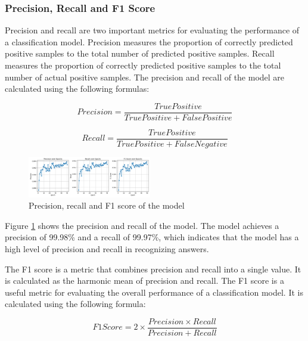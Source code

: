 \documentclass[twocolumn]{article}
\begin{document}
    \subsubsection{Precision, Recall and F1 Score}
    Precision and recall are two important metrics for evaluating the performance of a classification model. Precision measures the proportion of correctly predicted positive samples to the total number of predicted positive samples. Recall measures the proportion of correctly predicted positive samples to the total number of actual positive samples. The precision and recall of the model are calculated using the following formulas:

    \begin{equation}
        Precision = \frac{True Positive}{True Positive + False Positive}
    \end{equation}

    \begin{equation}
        Recall = \frac{True Positive}{True Positive + False Negative}
    \end{equation}

    \begin{figure}[ht]
        \centering
        \includegraphics[width=0.48\textwidth]{precision.png}
        \caption{Precision, recall and F1 score of the model}
        \label{fig:precision}
    \end{figure}

    Figure \ref{fig:precision} shows the precision and recall of the model. The model achieves a precision of 99.98\% and a recall of 99.97\%, which indicates that the model has a high level of precision and recall in recognizing answers.

    The F1 score is a metric that combines precision and recall into a single value. It is calculated as the harmonic mean of precision and recall. The F1 score is a useful metric for evaluating the overall performance of a classification model. It is calculated using the following formula:

    \begin{equation}
        F1 Score = 2 \times \frac{Precision \times Recall}{Precision + Recall}
    \end{equation}
\end{document}
